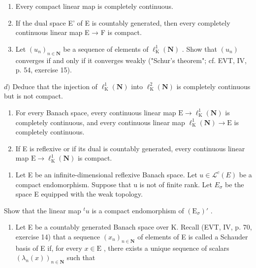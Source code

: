 \begin{enumerate}
\def\labelenumi{\alph{enumi})}
\item
  Every compact linear map is completely continuous.
\item
  If the dual space E' of E is countably generated, then every completely continuous linear map E → F is compact.
\item
  Let \((u_{n})_{n\in\mathbf{N}}\) be a sequence of elements of \(\ell_{\mathrm{K}}^{1}(\mathbf{N})\) . Show that \((u_{n})\) converges if and only if it converges weakly ("Schur's theorem"; cf. EVT, IV, p. 54, exercise 15).
\end{enumerate}

\(d)\) Deduce that the injection of \(\ell_{\mathrm{K}}^{1}(\mathbf{N})\) into \(\ell_{\mathrm{K}}^{2}(\mathbf{N})\) is completely continuous but is not compact.

\begin{enumerate}
\def\labelenumi{\alph{enumi})}
\setcounter{enumi}{4}
\item
  For every Banach space, every continuous linear map \(\mathrm{E} \to \ell_{\mathrm{K}}^{1}(\mathbf{N})\) is completely continuous, and every continuous linear map \(\ell_{\mathrm{K}}^{1}(\mathbf{N}) \to \mathrm{E}\) is completely continuous.
\item
  If E is reflexive or if its dual is countably generated, every continuous linear map \(\mathrm{E} \rightarrow \ell_{\mathrm{K}}^{1}(\mathbf{N})\) is compact.
\end{enumerate}

\begin{enumerate}
\def\labelenumi{\arabic{enumi})}
\setcounter{enumi}{11}
\tightlist
\item
  Let E be an infinite-dimensional reflexive Banach space. Let \(u \in \mathcal{L}^{c}(E)\) be a compact endomorphism. Suppose that u is not of finite rank. Let \(E_{\sigma}\) be the space E equipped with the weak topology.
\end{enumerate}

Show that the linear map \(^{t}u\) is a compact endomorphism of \((\mathrm{E}_{\sigma})'\) .

\begin{enumerate}
\def\labelenumi{\arabic{enumi})}
\setcounter{enumi}{12}
\tightlist
\item
  Let E be a countably generated Banach space over K. Recall (EVT, IV, p. 70, exercise 14) that a sequence \((x_{n})_{n\in \mathbf{N}}\) of elements of E is called a Schauder basis of E if, for every \(x\in \mathrm{E}\) , there exists a unique sequence of scalars \((\lambda_n(x))_{n\in \mathbf{N}}\) such that
\end{enumerate}

